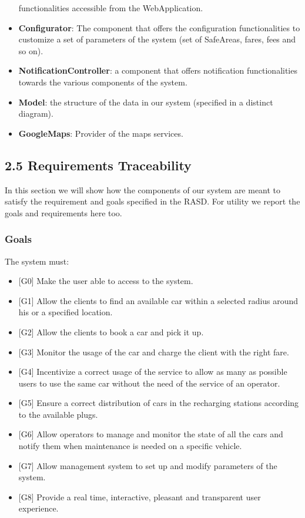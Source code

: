 \documentclass[]{article}
\providecommand{\tightlist}{%
  \setlength{\itemsep}{0pt}\setlength{\parskip}{0pt}}
\begin{document}
\begin{itemize}
  functionalities accessible from the WebApplication.
\item
  \textbf{Configurator}: The component that offers the configuration
  functionalities to customize a set of parameters of the system (set of
  SafeAreas, fares, fees and so on).
\item
  \textbf{NotificationController}: a component that offers notification
  functionalities towards the various components of the system.
\item
  \textbf{Model}: the structure of the data in our system (specified in
  a distinct diagram).
\item
  \textbf{GoogleMaps}: Provider of the maps services.
\end{itemize}

\subsection{2.5 Requirements
Traceability}\label{requirements-traceability}

In this section we will show how the components of our system are meant
to satisfy the requirement and goals specified in the RASD. For utility
we report the goals and requirements here too.

\subsubsection{Goals}\label{goals}

The system must:

\begin{itemize}
\tightlist
\item
  {[}G0{]} Make the user able to access to the system.
\item
  {[}G1{]} Allow the clients to find an available car within a selected
  radius around his or a specified location.
\item
  {[}G2{]} Allow the clients to book a car and pick it up.
\item
  {[}G3{]} Monitor the usage of the car and charge the client with the
  right fare.
\item
  {[}G4{]} Incentivize a correct usage of the service to allow as many
  as possible users to use the same car without the need of the service
  of an operator.
\item
  {[}G5{]} Ensure a correct distribution of cars in the recharging
  stations according to the available plugs.
\item
  {[}G6{]} Allow operators to manage and monitor the state of all the
  cars and notify them when maintenance is needed on a specific vehicle.
\item
  {[}G7{]} Allow management system to set up and modify parameters of
  the system.
\item
  {[}G8{]} Provide a real time, interactive, pleasant and transparent
  user experience.
\end{itemize}
\end{document}
